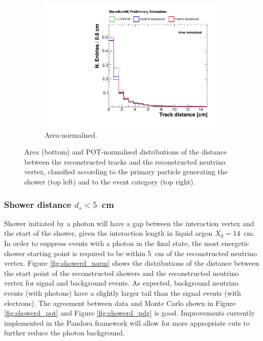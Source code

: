 \begin{figure}[htbp]
\begin{subfigure}{0.49\textwidth}
    \includegraphics[width=\linewidth]{figures/h_track_distance_norm.pdf}
    \caption{Area-normalised.} \label{fig:trackd_norm}
  \end{subfigure}
  \caption{Area (bottom) and POT-normalised distributions of the distance between the reconstructed tracks and the reconstructed neutrino vertex, classified according to the primary particle generating the shower (top left) and to the event category (top right).}
\end{figure}

\subsubsection*{Shower distance $d_{s} < 5$~cm}
Shower initiated by a photon will have a gap between the interaction vertex and the start of the shower, given the interaction length in liquid argon $X_{0}=14$~cm. In order to suppress events with a photon in the final state, the most energetic shower starting point is required to be within 5~cm of the reconstructed neutrino vertex.
Figure \ref{fig:showerd_norm} shows the distributions of the distance between the start point of the reconstructed showers and the reconstructed neutrino vertex for signal and background events. As expected, background neutrino events (with photons) have a slightly larger tail than the signal events (with electrons). The agreement between data and Monte Carlo shown in Figure \ref{fig:showerd_pot} {and Figure \ref{fig:showerd_pdg}} is good. Improvements currently implemented in the Pandora framework will allow for more appropriate cuts to further reduce the photon background.

